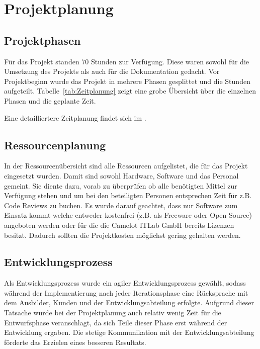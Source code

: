 \section{Projektplanung} 
\label{sec:Projektplanung}

\subsection{Projektphasen}
\label{sec:Projektphasen}
Für das Projekt standen 70 Stunden zur Verfügung. Diese waren sowohl für die Umsetzung des Projekts als auch für die Dokumentation gedacht. Vor Projektbeginn wurde das Projekt in mehrere Phasen gesplittet und die Stunden aufgeteilt. Tabelle~\ref{tab:Zeitplanung} zeigt eine grobe Übersicht über die einzelnen Phasen und die geplante Zeit. 

Eine detailliertere Zeitplanung findet sich im .

\subsection{Ressourcenplanung}
\label{sec:Ressourcenplanung}
In der Ressourcenübersicht  sind alle Ressourcen aufgelistet, die für das Projekt eingesetzt wurden. Damit sind sowohl Hardware, Software und das Personal gemeint. Sie diente dazu, vorab zu überprüfen ob alle benötigten Mittel zur Verfügung stehen und um bei den beteiligten Personen entsprechen Zeit für z.B. Code Reviews zu buchen. Es wurde darauf geachtet, dass nur Software zum Einsatz kommt welche entweder kostenfrei (z.B. als Freeware oder Open Source) angeboten werden oder für die die Camelot ITLab GmbH bereits Lizenzen besitzt. Dadurch sollten die Projektkosten möglichst gering gehalten werden.

\subsection{Entwicklungsprozess}
\label{sec:Entwicklungsprozess}
Als Entwicklungsprozess wurde ein agiler Entwicklungsprozess gewählt, sodass während der Implementierung nach jeder Iterationsphase eine Rücksprache mit dem Ausbilder, Kunden und der Entwicklungsabteilung erfolgte. Aufgrund dieser Tatsache wurde bei der Projektplanung auch relativ wenig Zeit für die Entwurfsphase veranschlagt, da sich Teile dieser Phase erst während der Entwicklung ergaben. Die stetige Kommunikation mit der Entwicklungsabteilung förderte das Erzielen eines besseren Resultats.